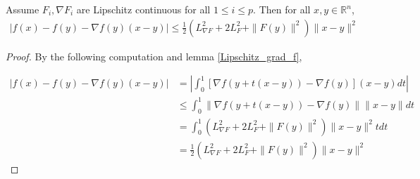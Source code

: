 \documentclass{article}
\begin{document}
\begin{lemma} \label{July_21_quadratic_upperbound}
Assume $F_i, \nabla F_i$ are Lipschitz continuous for all $1 \leq i \leq p$. Then for all $x,y \in \mathbb{R}^n$,
\begin{align}
|f(x) - f(y) - \nabla f(y)(x-y)| \leq \frac{1}{2}(L_{\nabla F}^2 + 2L_F^2 + \|F(y)\|^2)\|x-y\|^2
\end{align}

\begin{proof}
By the following computation and lemma \ref{Lipschitz_grad_f},

\begin{align*}
|f(x) - f(y) - \nabla f(y)(x-y)| & = \left|\int_0^1[\nabla f(y+t(x-y)) - \nabla f(y)](x-y)dt\right| \\ & \leq \int_0^1\| \nabla f(y+t(x-y)) - \nabla f(y) \| \|x-y\| dt \\ & = \int_0^1(L_{\nabla F}^2 + 2L_F^2 + \|F(y)\|^2)\|x-y\|^2tdt \\ & = \frac{1}{2}(L_{\nabla F}^2 + 2L_F^2 + \|F(y)\|^2)\|x-y\|^2
\end{align*}
\end{proof}
\end{lemma}
\end{document}
